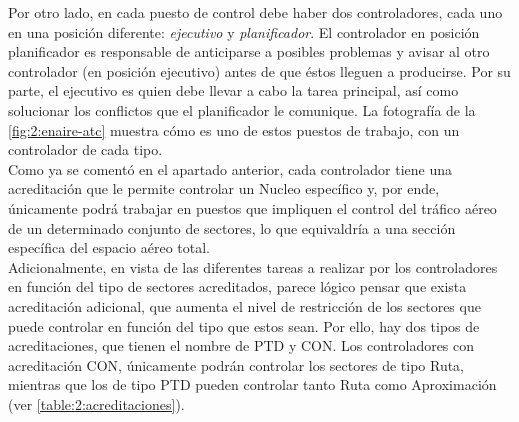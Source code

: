 Por otro lado, en cada puesto de control debe haber dos controladores, cada uno en una posición diferente: 
\textit{ejecutivo} y \textit{planificador}. El controlador en posición planificador es responsable de anticiparse a posibles problemas y avisar al otro controlador (en posición ejecutivo) antes de que éstos lleguen a producirse. Por su parte, el ejecutivo es quien debe llevar a cabo la tarea principal, así como solucionar los conflictos que el planificador le comunique. La fotografía de la \autoref{fig:2:enaire-atc} muestra cómo es uno de estos puestos de trabajo, con un controlador de cada tipo.
\\

Como ya se comentó en el apartado anterior, cada controlador tiene una acreditación que le permite controlar un \gls{Nucleo} específico y, por ende, únicamente podrá trabajar en puestos que impliquen el control del 
tráfico aéreo de un determinado conjunto de sectores, lo que equivaldría a una sección específica del espacio aéreo total.
\\

Adicionalmente, en vista de las diferentes tareas a realizar por los controladores en función del tipo de sectores acreditados, parece lógico pensar que exista acreditación adicional, que aumenta el nivel de restricción de los sectores que puede controlar en función del tipo que estos sean. Por ello, hay dos tipos de acreditaciones, que tienen el nombre de PTD y CON. Los controladores con acreditación CON, únicamente podrán controlar los sectores de tipo Ruta, mientras que los de tipo PTD pueden controlar tanto Ruta como Aproximación (ver \autoref{table:2:acreditaciones}).



